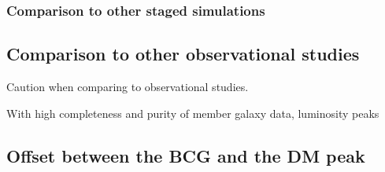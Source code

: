\subsubsection{Comparison to other staged simulations}
% 
% 
% 
% 
% 
% 



% 
% 
% 
% 
% 
% 
% 
% 
% 
% 
% 
% 
% 

\subsection{Comparison to other observational studies}

Caution when comparing to observational studies.



With high completeness and purity of member galaxy data, 
luminosity peaks  


\subsection{Offset between the BCG and the DM peak}
 
